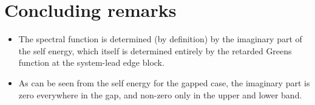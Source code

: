 \documentclass{article}
\begin{document}
\section{Concluding remarks}
\begin{itemize}
	\item The spectral function is determined (by definition) by the imaginary part of the self energy, which itself is determined entirely by the retarded Greens function at the system-lead edge block. 
	\item As can be seen from the self energy for the gapped case, the imaginary part is zero everywhere in the gap, and non-zero only in the upper and lower band.  
\end{itemize}
\end{document}
